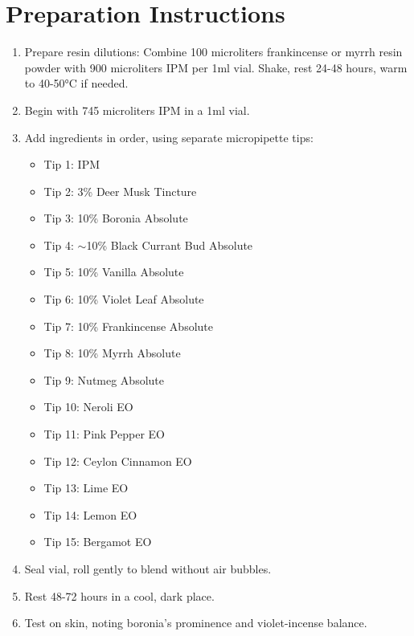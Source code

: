 \documentclass{article}
\begin{document}
\section*{Preparation Instructions}
\begin{enumerate}
  \item Prepare resin dilutions: Combine 100 microliters frankincense or myrrh resin powder with 900 microliters IPM per 1ml vial. Shake, rest 24-48 hours, warm to 40-50°C if needed.
  \item Begin with 745 microliters IPM in a 1ml vial.
  \item Add ingredients in order, using separate micropipette tips:
  \begin{itemize}
    \item Tip 1: IPM
    \item Tip 2: 3\% Deer Musk Tincture
    \item Tip 3: 10\% Boronia Absolute
    \item Tip 4: $\sim$10\% Black Currant Bud Absolute
    \item Tip 5: 10\% Vanilla Absolute
    \item Tip 6: 10\% Violet Leaf Absolute
    \item Tip 7: 10\% Frankincense Absolute
    \item Tip 8: 10\% Myrrh Absolute
    \item Tip 9: Nutmeg Absolute
    \item Tip 10: Neroli EO
    \item Tip 11: Pink Pepper EO
    \item Tip 12: Ceylon Cinnamon EO
    \item Tip 13: Lime EO
    \item Tip 14: Lemon EO
    \item Tip 15: Bergamot EO
  \end{itemize}
  \item Seal vial, roll gently to blend without air bubbles.
  \item Rest 48-72 hours in a cool, dark place.
  \item Test on skin, noting boronia’s prominence and violet-incense balance.
\end{enumerate}
\end{document}
